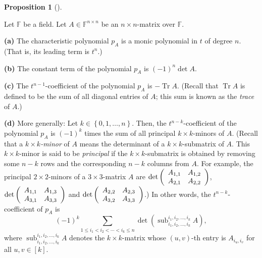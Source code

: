 \documentclass[numbers=enddot,12pt,final,onecolumn,notitlepage]{scrartcl}%
\numberwithin{exer}{subsection}
\theoremstyle{definition}
\newtheorem{prop}[theo]{Proposition}
\newenvironment{proposition}[1][]
{\begin{prop}[#1]\begin{leftbar}}
{\end{leftbar}\end{prop}}
\let\sumnonlimits\sum
\renewcommand{\sum}{\sumnonlimits\limits}
\begin{document}
\begin{proposition}
\label{prop.schurtri.ch.props}Let $\mathbb{F}$ be a field. Let $A\in
\mathbb{F}^{n\times n}$ be an $n\times n$-matrix over $\mathbb{F}$. \medskip

\textbf{(a)} The characteristic polynomial $p_{A}$ is a monic polynomial in
$t$ of degree $n$. (That is, its leading term is $t^{n}$.) \medskip

\textbf{(b)} The constant term of the polynomial $p_{A}$ is $\left(
-1\right)  ^{n}\det A$. \medskip

\textbf{(c)} The $t^{n-1}$-coefficient of the polynomial $p_{A}$ is
$-\operatorname*{Tr}A$. (Recall that $\operatorname*{Tr}A$ is defined to be
the sum of all diagonal entries of $A$; this sum is known as the \emph{trace}
of $A$.) \medskip

\textbf{(d)} More generally: Let $k\in\left\{  0,1,\ldots,n\right\}  $. Then,
the $t^{n-k}$-coefficient of the polynomial $p_{A}$ is $\left(  -1\right)
^{k}$ times the sum of all principal $k\times k$-minors of $A$. (Recall that a
$k\times k$\emph{-minor} of $A$ means the determinant of a $k\times
k$-submatrix of $A$. This $k\times k$-minor is said to be \emph{principal} if
the $k\times k$-submatrix is obtained by removing some $n-k$ rows and the
corresponding $n-k$ columns from $A$. For example, the principal $2\times
2$-minors of a $3\times3$-matrix $A$ are $\det\left(
\begin{array}
[c]{cc}%
A_{1,1} & A_{1,2}\\
A_{2,1} & A_{2,2}%
\end{array}
\right)  $, $\det\left(
\begin{array}
[c]{cc}%
A_{1,1} & A_{1,3}\\
A_{3,1} & A_{3,3}%
\end{array}
\right)  $ and $\det\left(
\begin{array}
[c]{cc}%
A_{2,2} & A_{2,3}\\
A_{3,2} & A_{3,3}%
\end{array}
\right)  $.) In other words, the $t^{n-k}$-coefficient of $p_{A}$ is
\[
\left(  -1\right)  ^{k}\sum_{1\leq i_{1}<i_{2}<\cdots<i_{k}\leq n}\det\left(
\operatorname*{sub}\nolimits_{i_{1},i_{2},\ldots,i_{k}}^{i_{1},i_{2}%
,\ldots,i_{k}}A\right)  ,
\]
where $\operatorname*{sub}\nolimits_{i_{1},i_{2},\ldots,i_{k}}^{i_{1}%
,i_{2},\ldots,i_{k}}A$ denotes the $k\times k$-matrix whose $\left(
u,v\right)  $-th entry is $A_{i_{u},i_{v}}$ for all $u,v\in\left[  k\right]  $.
\end{proposition}
\end{document}
